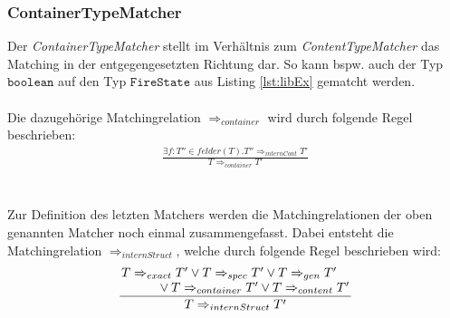 \documentclass[a4paper,12pt]{article}
\begin{document}
\subsubsection{ContainerTypeMatcher}
Der \emph{ContainerTypeMatcher} stellt im Verhältnis zum \emph{ContentTypeMatcher} das Matching in der entgegengesetzten Richtung dar. So kann bspw. auch der Typ $\texttt{boolean}$ auf den Typ $\texttt{FireState}$ aus Listing \ref{lst:libEx} gematcht werden.
\\\\
Die dazugehörige Matchingrelation $\Rightarrow_{container}$ wird durch folgende Regel beschrieben:
\begin{gather*}
\frac{\exists f:T''\in felder(T). T'' \Rightarrow_{internCont} T'}{T \Rightarrow_{container} T'}
\end{gather*}
\\\\
Zur Definition des letzten Matchers werden die Matchingrelationen der oben genannten Matcher noch einmal zusammengefasst. Dabei entsteht die Matchingrelation $\Rightarrow_{internStruct}$, welche durch folgende Regel beschrieben wird:
\begin{gather*}
\frac{\splitfrac{T \Rightarrow_{exact}T' \vee T \Rightarrow_{spec}T' 
\vee T \Rightarrow_{gen}T'}{\vee T \Rightarrow_{container} T' \vee T \Rightarrow_{content} T'}}{T \Rightarrow_{internStruct}T'}
\end{gather*}
\end{document}
